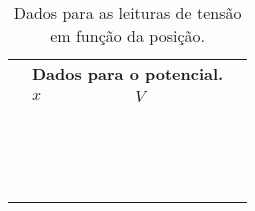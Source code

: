 \begin{table}
\label{Tab:ValoresPotencialEletricoEixoX}
	\begin{center}
		\begin{tabular}{cp{25mm}p{25mm}c}
		\toprule
		&\multicolumn{2}{l}{\textbf{Dados para o potencial.}} \\
		\cmidrule{2-3}
		& $x$ & $V$ \\
		\cmidrule{2-3}
		& \cellcolor[gray]{0.89} & \cellcolor[gray]{0.92} & \\
		& \cellcolor[gray]{0.95} & \cellcolor[gray]{0.97} \\
		& \cellcolor[gray]{0.89} & \cellcolor[gray]{0.92} \\
		& \cellcolor[gray]{0.95} & \cellcolor[gray]{0.97} \\
		& \cellcolor[gray]{0.89} & \cellcolor[gray]{0.92} \\
		& \cellcolor[gray]{0.95} & \cellcolor[gray]{0.97} \\
		& \cellcolor[gray]{0.89} & \cellcolor[gray]{0.92} \\
		& \cellcolor[gray]{0.95} & \cellcolor[gray]{0.97} \\
		& \cellcolor[gray]{0.89} & \cellcolor[gray]{0.92} \\
		& \cellcolor[gray]{0.95} & \cellcolor[gray]{0.97} \\
		& \cellcolor[gray]{0.89} & \cellcolor[gray]{0.92} \\
		& \cellcolor[gray]{0.95} & \cellcolor[gray]{0.97} \\
		& \cellcolor[gray]{0.89} & \cellcolor[gray]{0.92} \\
		& \cellcolor[gray]{0.95} & \cellcolor[gray]{0.97} \\
		& \cellcolor[gray]{0.89} & \cellcolor[gray]{0.92} \\
		& \cellcolor[gray]{0.95} & \cellcolor[gray]{0.97} \\
		\cmidrule{2-3}
		\bottomrule
		\end{tabular}
	\end{center}
	\caption{Dados para as leituras de tensão em função da posição.}
\end{table}
